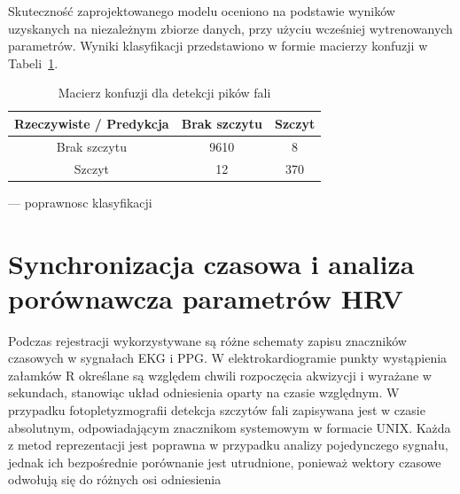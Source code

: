 \documentclass[journal]{IEEEtran}
\begin{document}
\newpage
Skuteczność zaprojektowanego modelu oceniono na podstawie wyników uzyskanych na niezależnym zbiorze danych, przy użyciu wcześniej wytrenowanych parametrów. Wyniki klasyfikacji przedstawiono w formie macierzy konfuzji w Tabeli~\ref{tab:conf_matrix_ppg}.

\begin{table}[ht]
\centering
\caption{Macierz konfuzji dla detekcji pików fali}
\label{tab:conf_matrix_ppg}
\begin{tabular}{|c|c|c|}
\hline
\textbf{Rzeczywiste / Predykcja} & \textbf{Brak szczytu } & \textbf{Szczyt} \\
\hline
Brak szczytu  & 9610 & 8 \\
\hline
Szczyt  & 12 & 370 \\
\hline
\end{tabular}
\end{table}

--- poprawnosc klasyfikacji


\section{Synchronizacja czasowa i analiza porównawcza parametrów HRV}



Podczas rejestracji wykorzystywane są różne schematy zapisu znaczników czasowych w sygnałach EKG i PPG. W elektrokardiogramie punkty wystąpienia załamków R określane są względem chwili rozpoczęcia akwizycji i wyrażane w sekundach, stanowiąc układ odniesienia oparty na czasie względnym.
W przypadku fotopletyzmografii detekcja szczytów fali zapisywana jest w czasie absolutnym, odpowiadającym znacznikom systemowym w formacie UNIX. Każda z metod reprezentacji jest poprawna w przypadku analizy pojedynczego sygnału, jednak ich bezpośrednie porównanie jest utrudnione, ponieważ wektory czasowe odwołują się do różnych osi odniesienia
\end{document}
